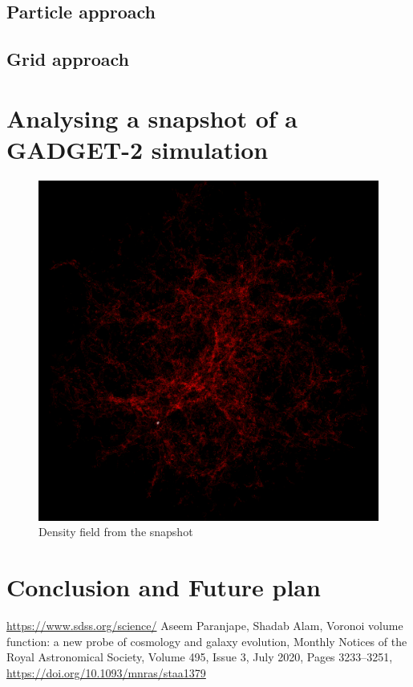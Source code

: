 \documentclass[12pt]{article}
\begin{document}
\subsection{Particle approach}

\subsection{Grid approach}


\section{Analysing a snapshot of a GADGET-2 simulation}
\cite{aseem_shadab}

\begin{figure}[H]
	\centering
	\includegraphics[width=0.7\linewidth]{../density_assign/UniformGridData_Render_density}
	\caption{Density field from the snapshot}
	\label{fig:uniformgriddatarenderdensity}
\end{figure}


\section{Conclusion and Future plan}




\begin{thebibliography}{widest entry}
 \url{https://www.sdss.org/science/}
 Aseem Paranjape, Shadab Alam, Voronoi volume function: a new probe of cosmology and galaxy evolution, Monthly Notices of the Royal Astronomical Society, Volume 495, Issue 3, July 2020, Pages 3233–3251, \url{https://doi.org/10.1093/mnras/staa1379}
\end{thebibliography}
\end{document}
